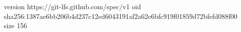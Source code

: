 version https://git-lfs.github.com/spec/v1
oid sha256:1387ae6bb206b4d237c12ed6043191af2a62e6bfc919f01859d72bfefd088f00
size 156

